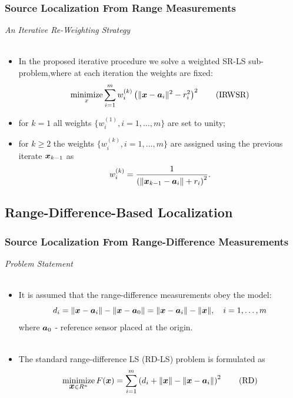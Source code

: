 \documentclass [t] {beamer} %
\begin{document}
\begin{frame}%
\frametitle{Source Localization From Range Measurements}
{\large \textit{An Iterative Re-Weighting Strategy}} 
\\~\\
\normalsize

\begin{itemize}
\item 
 In the proposed iterative procedure we solve a weighted SR-LS sub-problem,where at each iteration the weights are fixed:
\begin{equation} \label{IRWSR}
\mathop{\mbox{minimize}}_{x} \sum_{i=1}^m w_i^{(k)}\left(\|\mbox{\boldmath$x$}-\mbox{\boldmath$a$}_i\|^2-r_i^2\right)^2 \tag{IRWSR}
\end{equation}
\item 
 for $k=1$ all weights $\{w_i^{(1)}, i=1,\ldots, m\}$ are set to unity; \\
 \item 
 for $k\geq2$ the weights $\{w_i^{(k)},i=1,\ldots,m\}$ are assigned using the previous iterate $\mbox{\boldmath$x$}_{k-1}$ as
\begin{equation} 
\nonumber
w_i^{(k)}=\frac{1}{\left(\|\mbox{\boldmath$x$}_{k-1}-\mbox{\boldmath$a$}_i\|+r_i\right)^2}.
\end{equation}

\end{itemize}
\end{frame}



\subsection{Range-Difference-Based Localization} %


\begin{frame} %
\frametitle{Source Localization From Range-Difference Measurements} %
{\large \textit{Problem Statement}}
\\~\\
\normalsize
\begin{itemize}
\item 
It is assumed that the range-difference measurements obey the model:
 \begin{equation} 
 \nonumber
 d_i=\|\mbox{\boldmath$x$}-\mbox{\boldmath$a$}_i\|-\|\mbox{\boldmath$x$}-\mbox{\boldmath$a$}_0\|=\|\mbox{\boldmath$x$}-\mbox{\boldmath$a$}_i\|-\|\mbox{\boldmath$x$}\|, \quad i = 1,\ldots,m
 \end{equation}
where $\mbox{\boldmath$a$}_0$ - reference sensor placed at the origin.\\~\\
 \item 
 The standard range-difference LS (RD-LS) problem is formulated as
 \begin{equation} \label{RD}
\mathop{\mbox{minimize}}_{\mbox{\boldmath$x$} \in R^n} F(\mbox{\boldmath$x$})=\sum_{i=1}^m \left(d_i+\|\mbox{\boldmath$x$}\|-\|\mbox{\boldmath$x$}-\mbox{\boldmath$a$}_i\|\right)^2 \tag{RD}
 \end{equation}
 \end{itemize}
\end{frame}
\end{document}
